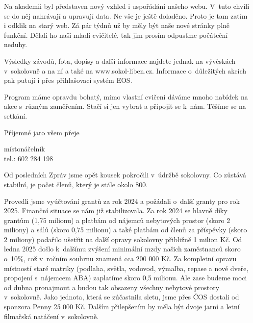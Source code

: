 \documentclass[11pt]{article}
\begin{document}
Na akademii byl představen nový vzhled i uspořádání našeho webu. V~tuto chvíli se do něj nahrávají a upravují data. Ne vše je ještě doladěno. Proto je tam zatím i odklik na starý web. Zá pár týdnů už by měly být naše nové stránky plně funkční. Dělali ho naši mladí cvičitelé, tak jim prosím odpusťme počáteční neduhy. 

Výsledky závodů, fota, dopisy a další informace najdete jednak na vývěskách v~sokolovně a na ní a také na www.sokol-liben.cz. Informace o~důležitých akcích pak putují i přes přihlašovací systém EOS.

Program máme opravdu bohatý, mimo vlastní cvičení dáváme mnoho nabídek na akce s~různým zaměřením. Stačí si jen vybrat a připojit se k~nám. Těšíme se na setkání.

Příjemné jaro všem přeje 

\signature{Jiří Novák (Jirkan)}{místonáčelník\\tel.: 602 284 198}

\vspace*{24pt}


Od posledních Zpráv jsme opět kousek pokročili v~údržbě sokolovny. Co zůstává stabilní, je počet členů, který je stále okolo 800.

Provedli jsme vyúčtování grantů za rok 2024 a požádali o~další granty pro rok 2025.
Finanční situace se nám již stabilizovala. Za rok 2024 se hlavně díky grantům (1,75 milionu) a platbám od nájemců nebytových prostor (skoro 2 miliony) a sálů (skoro 0,75 milionu) a také platbám od členů za příspěvky (skoro 2 miliony) podařilo ušetřit na další opravy sokolovny přibližně 1 milion Kč. 
Od ledna 2025 došlo k~dalšímu zvýšení minimální mzdy našich zaměstnanců skoro o~10\%, což v~ročním souhrnu znamená cca 200 000 Kč. Za kompletní opravu místností staré matriky (podlaha, světla, vodovod, výmalba, repase a nové dveře, propojení s~nájemcem ABA) zaplatíme skoro 0,5 milionu. Ale zase budeme moci od dubna pronajmout a budou tak obsazeny všechny nebytové prostory v~sokolovně.
Jako jednota, která se zúčastnila sletu, jsme přes ČOS dostali od sponzora Penny 25 000 Kč. Dalším přilepšením by měla být dvoje jarní a letní filmařská natáčení v~sokolovně.
\end{document}

